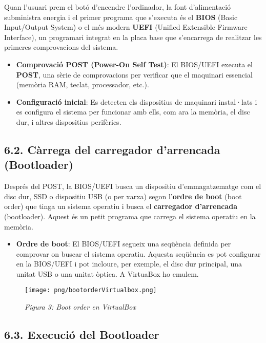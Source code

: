 \documentclass[
  a4paper,
]{article}
\providecommand{\tightlist}{%
  \setlength{\itemsep}{0pt}\setlength{\parskip}{0pt}}
\begin{document}
Quan l'usuari prem el botó d'encendre l'ordinador, la font d'alimentació
subministra energia i el primer programa que s'executa és el
\textbf{BIOS} (Basic Input/Output System) o el més modern \textbf{UEFI}
(Unified Extensible Firmware Interface), un programari integrat en la
placa base que s'encarrega de realitzar les primeres comprovacions del
sistema.

\begin{itemize}
\item
  \textbf{Comprovació POST (Power-On Self Test)}: El BIOS/UEFI executa
  el \textbf{POST}, una sèrie de comprovacions per verificar que el
  maquinari essencial (memòria RAM, teclat, processador, etc.).
\item
  \textbf{Configuració inicial}: Es detecten els dispositius de
  maquinari instal·lats i es configura el sistema per funcionar amb
  ells, com ara la memòria, el disc dur, i altres dispositius
  perifèrics.
\end{itemize}

\subsection{6.2. Càrrega del carregador d'arrencada
(Bootloader)}\label{cuxe0rrega-del-carregador-darrencada-bootloader}

Després del POST, la BIOS/UEFI busca un dispositiu d'emmagatzematge com
el disc dur, SSD o dispositiu USB (o per xarxa) segon l'\textbf{ordre de
boot} (boot order) que tinga un sistema operatiu i busca el
\textbf{carregador d'arrencada} (bootloader). Aquest és un petit
programa que carrega el sistema operatiu en la memòria.

\begin{itemize}
\tightlist
\item
  \textbf{Ordre de boot}: El BIOS/UEFI segueix una seqüència definida
  per comprovar on buscar el sistema operatiu. Aquesta seqüència es pot
  configurar en la BIOS/UEFI i pot incloure, per exemple, el disc dur
  principal, una unitat USB o una unitat òptica. A VirtuaBox ho emulem.
\end{itemize}

\begin{figure}
\centering
\texttt{[image: png/bootorderVirtualbox.png]}
\caption{\emph{Figura 3: Boot order en VirtualBox}}
\end{figure}

\subsection{6.3. Execució del
Bootloader}\label{execuciuxf3-del-bootloader}
\end{document}
